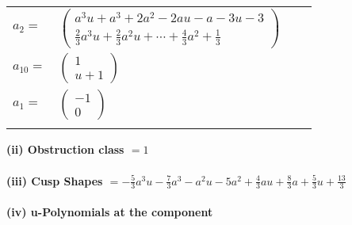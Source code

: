 \documentclass[1p]{elsarticle_modified}
\theoremstyle{definition}
\begin{document}
\begin{tabular}{m{7pt} m{180pt} m{7pt} m{180pt} }
\flushright $a_{2}=$&$\begin{pmatrix}a^3 u+a^3+2 a^2-2 a u- a-3 u-3\\\frac{2}{3} a^3 u+\frac{2}{3} a^2 u+\cdots+\frac{4}{3} a^2+\frac{1}{3}\end{pmatrix}$ \\
\flushright $a_{10}=$&$\begin{pmatrix}1\\u+1\end{pmatrix}$ \\
\flushright $a_{1}=$&$\begin{pmatrix}-1\\0\end{pmatrix}$\\&\end{tabular}
\flushleft \textbf{(ii) Obstruction class $= 1$}\\~\\
\flushleft \textbf{(iii) Cusp Shapes $= -\frac{5}{3} a^3 u-\frac{7}{3} a^3- a^2 u-5 a^2+\frac{4}{3} a u+\frac{8}{3} a+\frac{5}{3} u+\frac{13}{3}$}\\~\\
\newpage\renewcommand{\arraystretch}{1}
\flushleft \textbf{(iv) u-Polynomials at the component}\newline \\
\end{document}
